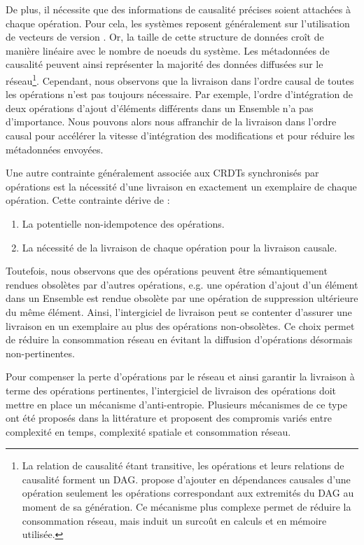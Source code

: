 \documentclass[12pt]{thesul}
\newcommand{\eg}{e.g. }
\begin{document}
De plus, il nécessite que des informations de causalité précises soient attachées à chaque opération.
Pour cela, les systèmes reposent généralement sur l'utilisation de vecteurs de version .
Or, la taille de cette structure de données croît de manière linéaire avec le nombre de noeuds du système.
Les métadonnées de causalité peuvent ainsi représenter la majorité des données diffusées sur le réseau\footnote{
  La relation de causalité étant transitive, les opérations et leurs relations de causalité forment un DAG.
  \cite{1997-causal-barrier} propose d'ajouter en dépendances causales d'une opération seulement les opérations correspondant aux extremités du DAG au moment de sa génération.
  Ce mécanisme plus complexe permet de réduire la consommation réseau, mais induit un surcoût en calculs et en mémoire utilisée.
}.
Cependant, nous observons que la livraison dans l'ordre causal de toutes les opérations n'est pas toujours nécessaire.
Par exemple, l'ordre d'intégration de deux opérations d'ajout d'éléments différents dans un Ensemble n'a pas d'importance.
Nous pouvons alors nous affranchir de la livraison dans l'ordre causal pour accélérer la vitesse d'intégration des modifications et pour réduire les métadonnées envoyées.

Une autre contrainte généralement associée aux \acp{CRDT} synchronisés par opérations est la nécessité d'une livraison en exactement un exemplaire de chaque opération.
Cette contrainte dérive de :
\begin{enumerate}[label=(\roman*)]
  \item La potentielle non-idempotence des opérations.
  \item La nécessité de la livraison de chaque opération pour la livraison causale.
\end{enumerate}
Toutefois, nous observons que des opérations peuvent être sémantiquement rendues obsolètes par d'autres opérations, \eg une opération d'ajout d'un élément dans un Ensemble est rendue obsolète par une opération de suppression ultérieure du même élément.
Ainsi, l'intergiciel de livraison peut se contenter d'assurer une livraison en un exemplaire au plus des opérations non-obsolètes.
Ce choix permet de réduire la consommation réseau en évitant la diffusion d'opérations désormais non-pertinentes.

Pour compenser la perte d'opérations par le réseau et ainsi garantir la livraison à terme des opérations pertinentes, l'intergiciel de livraison des opérations doit mettre en place un mécanisme d'anti-entropie.
Plusieurs mécanismes de ce type ont été proposés dans la littérature \cite{1983-anti-entropy-vv, 2007-dynamo, 2015-approximate-hash-based-set-reconciliation, 2017-anti-entropy-without-merkle-trees}  et proposent des compromis variés entre complexité en temps, complexité spatiale et consommation réseau.
\end{document}
